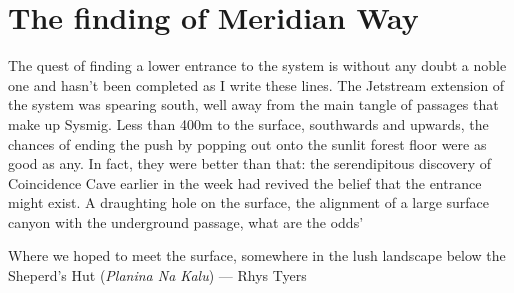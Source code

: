 \section{The finding of Meridian Way} 
\begin{marginfigure}
\end{marginfigure}

The quest of finding a lower entrance to the system is without any doubt a noble one and hasn't been completed as I write these lines. The Jetstream extension of the system was spearing south, well away from the main tangle of passages that make up Sysmig. Less than 400m to the surface, southwards and upwards, the chances of ending the push by popping out onto the sunlit forest floor were as good as any. In fact, they were better than that: the serendipitous discovery of Coincidence Cave earlier in the week had revived the belief that the entrance might exist. A draughting hole on the surface, the alignment of a large surface canyon with the underground passage, what are the odds' 


\begin{pagefigure}
\checkoddpage \ifoddpage \forcerectofloat \else \forceversofloat \fi
\centering
{}
\caption{Where we hoped to meet the surface, somewhere in the lush landscape below the Sheperd's Hut (\emph{Planina Na Kalu}) --- Rhys Tyers}
\label{Notebook}
\end{pagefigure}

